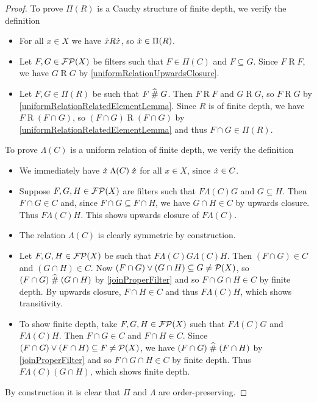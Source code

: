 \begin{proof}
To prove $\Pi(R)$ is a Cauchy structure of finite depth, we verify the definition
\begin{itemize}
\item For all $x\in X$ we have $\dot{x}R\dot{x}$, so $\dot{x}\in \Pi(R)$.
\item Let $F,G\in \operatorname{\mathcal{FP}}(X)$ be filters such that $F\in \Pi(C)$ and $F\subseteq G$. Since $F\mathrel{R}F$, we have  $G\mathrel{R}G$ by \ref{uniformRelationUpwardsClosure}.
\item Let $F,G\in\Pi(R)$ be such that $F\mathrel{\widehat{\#}} G$. Then $F\mathrel{R}F$ and $G\mathrel{R}G$, so $F\mathrel{R}G$ by \ref{uniformRelationRelatedElementLemma}. Since $R$ is of finite depth, we have $F\mathrel{R}(F\cap G)$, so $(F\cap G)\mathrel{R}(F\cap G)$ by \ref{uniformRelationRelatedElementLemma} and thus $F\cap G\in \Pi(R)$.
\end{itemize}
To prove $\Lambda(C)$ is a uniform relation of finite depth, we verify the definition
\begin{itemize}
\item We immediately have $\dot{x}\mathrel{\Lambda(C)}\dot{x}$ for all $x\in X$, since $\dot{x}\in C$.
\item Suppose $F,G,H\in\operatorname{\mathcal{FP}}(X)$ are filters such that $F\mathrel{\Lambda(C)}G$ and $G\subseteq H$. Then $F\cap G\in C$ and, since $F\cap G \subseteq F\cap H$, we have $G\cap H\in C$ by upwards closure. Thus $F\mathrel{\Lambda(C)}H$. This shows upwards closure of $F\mathrel{\Lambda(C)}$.
\item The relation $\mathrel{\Lambda(C)}$ is clearly symmetric by construction.
\item Let $F,G,H\in \operatorname{\mathcal{FP}}(X)$ be such that $F\mathrel{\Lambda(C)}G\mathrel{\Lambda(C)}H$. Then $(F\cap G)\in C$ and $(G\cap H)\in C$. Now $(F\cap G) \vee (G\cap H) \subseteq G \neq \operatorname{\mathcal{P}}(X)$, so $(F\cap G) \mathrel{\widehat{\#}} (G\cap H)$ by \ref{joinProperFilter} and so $F\cap G \cap H \in C$ by finite depth. By upwards closure, $F\cap H\in C$ and thus $F\mathrel{\Lambda(C)} H$, which shows transitivity.
\item To show finite depth, take $F,G,H\in \operatorname{\mathcal{FP}}(X)$ such that $F\mathrel{\Lambda(C)}G$ and $F\mathrel{\Lambda(C)}H$. Then $F\cap G\in C$ and $F\cap H\in C$. Since $(F\cap G)\vee (F\cap H) \subseteq F\neq \operatorname{\mathcal{P}}(X)$, we have $(F\cap G)\mathrel{\widehat{\#}} (F\cap H)$ by \ref{joinProperFilter} and so $F\cap G\cap H\in C$ by finite depth. Thus $F\mathrel{\Lambda(C)}(G\cap H)$, which shows finite depth.
\end{itemize}
By construction it is clear that $\Pi$ and $\Lambda$ are order-preserving.


\end{proof}
